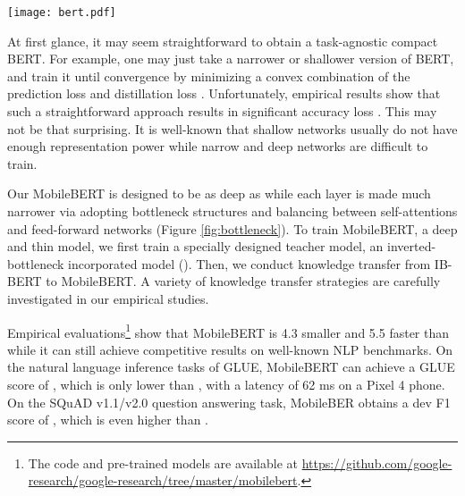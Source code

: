 \documentclass[11pt,a4paper]{article}
\begin{document}
\begin{figure*}[t]
	\centering
	\texttt{[image: bert.pdf]}
\caption{Illustration of three models:  (a) BERT; (b) Inverted-Bottleneck BERT (IB-BERT); and (c) MobileBERT.  In (b) and (c),
	\textcolor{myred}{red lines denote {inter-block} flows} while \textcolor{myblue}{{blue lines} {intra-block} flows}. MobileBERT is  trained by layer-to-layer imitating IB-BERT.  
}
\label{fig:bottleneck}
\end{figure*}

At first glance, it may seem straightforward to obtain a task-agnostic compact BERT.  For example, one may just take a narrower or shallower version of BERT, and train it until convergence by minimizing a convex combination of the prediction loss and distillation loss \citep{turc2019well, sun2019patient}. Unfortunately, empirical results show that such a straightforward approach results in significant accuracy loss \citep{turc2019well}.  This may not be that surprising. It is well-known that shallow networks usually do not have enough representation power while narrow and deep networks are difficult to train. 

Our MobileBERT is designed to be as deep as  
while each layer is made much narrower via adopting bottleneck structures and balancing between self-attentions and feed-forward networks (Figure \ref{fig:bottleneck}). To train MobileBERT, a deep and thin model,  we  
first train a specially designed teacher model, an inverted-bottleneck incorporated  model (). Then, we conduct knowledge transfer from IB-BERT to MobileBERT. A variety of knowledge transfer strategies are carefully investigated in our empirical studies.  



Empirical evaluations\footnote{The code and pre-trained models are available at \url{https://github.com/google-research/google-research/tree/master/mobilebert}.} show that MobileBERT is 4.3 smaller and 5.5 faster than   while it can still achieve competitive results on well-known NLP benchmarks.
On the natural language inference tasks of GLUE, MobileBERT can achieve a GLUE score of , which is only  lower than , with a  latency of 62 ms on a Pixel 4 phone. On the SQuAD v1.1/v2.0 question answering task, MobileBER  obtains a dev F1 score  of ,   which is even  higher than .
\end{document}
